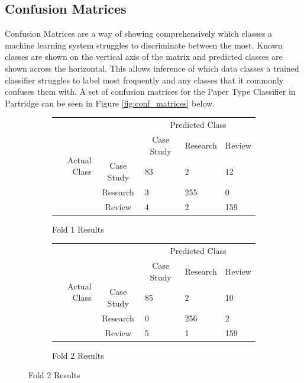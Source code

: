 \subsection{ Confusion Matrices}

Confusion Matrices are a way of showing comprehensively which classes a machine
learning system struggles to discriminate between the most. Known classes are
shown on the vertical axis of the matrix and predicted classes are shown across
the horizontal. This allows inference of which data classes a trained
classifier struggles to label most frequently and any classes that it commonly
confuses them with. A set of confusion matrices for the Paper Type Classifier
in Partridge can be seen in Figure \ref{fig:conf_matrices} below.

\begin{figure}[!h]

\centering

\begin{subfigure}[b]{\textwidth}

\caption{Fold 1 Results}
\centering
\begin{tabular}{ | r l l l l |}
\hline
\multirow{5}{*}{\begin{sideways}{Actual Class}\end{sideways}}
&&\multicolumn{3}{c|}{Predicted Class} \\
&& \multicolumn{1}{c}{Case Study} &	Research&	\multicolumn{1}{c|}{Review}\\
\cline{3-5}
& \multicolumn{1}{c|}{Case Study} &	83&		2&		12\\
&\multicolumn{1}{c|}{Research}&	3&		255&		0\\
&\multicolumn{1}{c|}{Review}&	4&		2&		159\\
\hline

\end{tabular}
\end{subfigure}


\begin{subfigure}[b]{\textwidth}

\caption{Fold 2 Results}
\centering
\begin{tabular}{ | r l l l l |}
\hline
\multirow{5}{*}{\begin{sideways}{Actual Class}\end{sideways}}
&&\multicolumn{3}{c|}{Predicted Class} \\
&& \multicolumn{1}{c}{Case Study} &	Research&	\multicolumn{1}{c|}{Review}\\
\cline{3-5}
&\multicolumn{1}{c|}{Case Study}&   85    &         2&		10\\
&\multicolumn{1}{c|}{Research}&	0   &		256&		2\\
&\multicolumn{1}{c|}{Review}&	5&		1&		159\\
\hline
\end{tabular}


\end{subfigure}
\end{figure}
